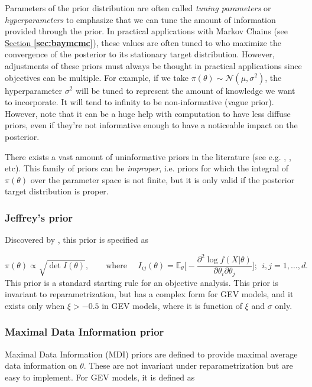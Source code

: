 Parameters of the prior distribution are often called \emph{tuning parameters} or \emph{hyperparameters} to emphasize that we can tune the amount of information provided through the prior. In practical applications with  Markov Chains (see \hyperref[sec:baymcmc]{Section \textbf{\ref{sec:baymcmc}}}), these values are often tuned to who maximize the convergence of the posterior to its stationary target distribution. However, adjustments of these priors must always be thought in practical applications since objectives can be multiple. For example, if we take $\pi(\theta)\sim\mathcal{N}(\mu,\sigma^2)$,  the hyperparameter $\sigma^2$ will be tuned to represent the amount of knowledge we want to incorporate. It will tend to infinity to be non-informative (vague prior). However, note that it can be a huge help with computation to have less diffuse priors, even
if they're not informative enough to have a noticeable impact on the posterior.


There exists a vast amount of uninformative priors in the literature (see e.g. \cite{yang_catalog_1996}, \cite{ni_noninformative_2003}, etc).
This family of priors can be \emph{improper}, i.e. priors for which the integral of $\pi(\theta)$ over the parameter space is not finite, but it is only valid if the posterior target distribution is proper. 


\subsubsection*{Jeffrey's prior} 
Discovered by \citet{Jeffreys61a}, this prior is specified as 

\begin{equation}
\pi(\theta)\propto \sqrt{\det I(\theta)}, \qquad \text{where }\quad I_{ij}(\theta)=\mathbb{E}_{\theta}\Bigg[-\frac{\partial^2\log f(X|\theta)}{\partial\theta_i\partial\theta_j}\Bigg]; \ \ i,j= 1,\dots,d.
\end{equation}
This prior is a standard starting rule for an objective analysis.
This prior is invariant to reparametrization, but has a complex form for GEV models, and it exists only when $\xi>-0.5$ in GEV models, where it is function of $\xi$ and $\sigma$ only.


\subsubsection*{Maximal Data Information  prior}
Maximal Data Information (MDI) priors are defined to provide maximal average data information on $\theta$. These are not invariant under reparametrization but are easy to implement. For GEV models, it is defined as 

